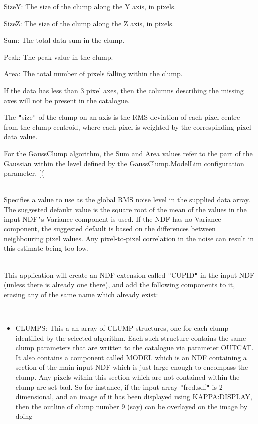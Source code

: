 \documentclass[twoside,11pt]{article}
\renewcommand{\_}{\texttt{\symbol{95}}}
\newcommand{\sstsubsection}[1]{ \item[{#1}] \mbox{} \\}
\newcommand{\sstdiytopic}[2]{\item[{\hspace{-0.35em}#1\hspace{-0.35em}:}]
\mbox{} \\[1.3ex] #2}
\newcommand{\sstitemlist}[1]{
  \mbox{} \\
  \vspace{-3.5ex}
  \begin{itemize}
     #1
  \end{itemize}
}
\newcommand{\sstitem}{\item}
\newcommand{\sstsubsection}[1]{\item[{#1}]}
\newcommand{\sstdiytopic}[2]{\item[{#1}] #2 }
\newcommand{\sstitemlist}[1]{
      \begin{itemize}
         #1
      \end{itemize}
      \\
   }
\newcommand{\sstitem}{\item}
\begin{document}
{{{{            \sstitem
            SizeY: The size of the clump along the Y axis, in pixels.

            \sstitem
            SizeZ: The size of the clump along the Z axis, in pixels.

            \sstitem
            Sum: The total data sum in the clump.

            \sstitem
            Peak: The peak value in the clump.

            \sstitem
            Area: The total number of pixels falling within the clump.

         }
         If the data has less than 3 pixel axes, then the columns
         describing the missing axes will not be present in the catalogue.

         The {\tt "}size{\tt "} of the clump on an axis is the RMS deviation of each
         pixel centre from the clump centroid, where each pixel is
         weighted by the correspinding pixel data value.

         For the GaussClump algorithm, the Sum and Area values refer
         to the part of the Gaussian within the level defined by the
         GaussClump.ModelLim configuration parameter. [!]
      }
      \sstsubsection{
         RMS = \_DOUBLE (Read)
      }{
         Specifies a value to use as the global RMS noise level in the
         supplied data array. The suggested defaukt value is the square root
         of the mean of the values in the input NDF{\tt '}s Variance component is
         used. If the NDF has no Variance component, the suggested default
         is based on the differences between neighbouring pixel values. Any
         pixel-to-pixel correlation in the noise can result in this estimate
         being too low.
      }
   }
   \sstdiytopic{
      Use of CUPID Extension
   }{
      This application will create an NDF extension called {\tt "}CUPID{\tt "} in the
      input NDF (unless there is already one there), and add the following
      components to it, erasing any of the same name which already exist:

      \sstitemlist{

         \sstitem
         CLUMPS: This a an array of CLUMP structures, one for each clump
         identified by the selected algorithm. Each such structure contains
         the same clump parameters that are written to the catalogue via
         parameter OUTCAT. It also contains a component called MODEL which
         is an NDF containing a section of the main input NDF which is just
         large enough to encompass the clump. Any pixels within this section
         which are not contained within the clump are set bad. So for instance,
         if the input array {\tt "}fred.sdf{\tt "} is 2-dimensional, and an image of it has
         been displayed using KAPPA:DISPLAY, then the outline of clump number 9
         (say) can be overlayed on the image by doing

}}}
\end{document}
